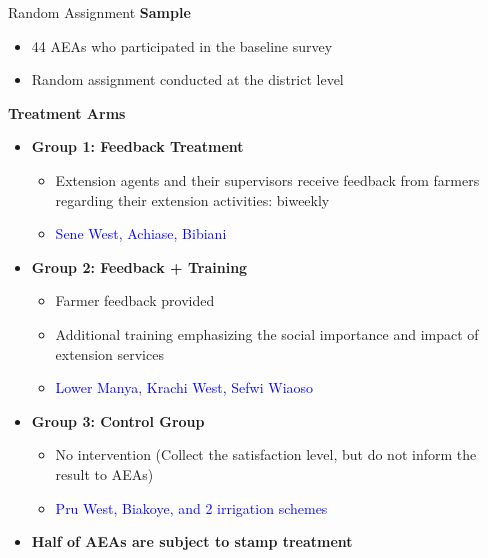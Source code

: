 \documentclass[aspectratio=169]{beamer}
\begin{document}
\begin{frame}{Random Assignment}
	\textbf{Sample}
	\begin{itemize}
		\item 44 AEAs who participated in the baseline survey
		\item Random assignment conducted at the district level
	\end{itemize}
	
	
	\textbf{Treatment Arms}
	\begin{itemize}
		\item \textbf{Group 1: Feedback Treatment}
		\begin{itemize}
			\item Extension agents and their supervisors receive feedback from farmers regarding their extension activities: biweekly
			\item \textcolor{blue}{Sene West, Achiase, Bibiani}
		\end{itemize}
		
		\item \textbf{Group 2: Feedback + Training}
		\begin{itemize}
			\item Farmer feedback provided
			\item Additional training emphasizing the social importance and impact of extension services
			\item \textcolor{blue}{Lower Manya, Krachi West, Sefwi Wiaoso}
		\end{itemize}
		
		\item \textbf{Group 3: Control Group}
		\begin{itemize}
			\item No intervention (Collect the satisfaction level, but do not inform the result to AEAs) 
			\item \textcolor{blue}{Pru West, Biakoye, and 2 irrigation schemes}
		\end{itemize}
		
		\item \textbf{Half of AEAs are subject to stamp treatment}
		
	\end{itemize}
	
\end{frame}
\end{document}
